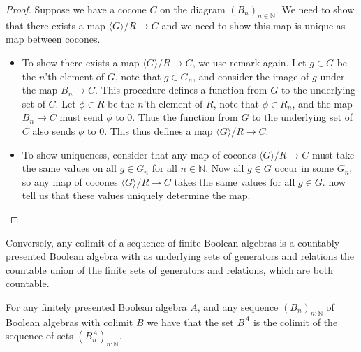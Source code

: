 \begin{proof}
  Suppose we have a cocone $C$ on the diagram $(B_n)_{n\in\mathbb N}$. 
  We need to show that there exists a map $\langle G \rangle / R\to C$ and
  we need to show this map is unique as map between cocones. 
  \begin{itemize}
    \item To show there exists a map $\langle G \rangle / R \to C$, 
      we use remark  again. 
      Let $g\in G$ be the $n$'th element of $G$, 
      note that $g\in G_n$, and consider the image of $g$ under the map $B_n \to C$. 
      This procedure defines a function from $G$ to the underlying set of $C$. 
      Let $\phi \in R$ be the $n$'th element of $R$, 
      note that $\phi \in R_n$, and the map $B_n \to C$ must send $\phi$ to $0$. 
      Thus the function from $G$ to the underlying set of $C$ also sends $\phi$ to $0$. 
      This thus defines a map $\langle G \rangle / R \to C$. 
    \item To show uniqueness, consider that any map of cocones $\langle G \rangle /R \to C$ 
      must take the same values on all $g\in G_n$ for all $n\in\mathbb N$. 
      Now all $g\in G$ occur in some $G_n$, so any map of cocones $\langle G \rangle /R \to C$ 
      takes the same values for all $g\in G$. 
       now tell us that these values uniquely determine the map. 
  \end{itemize}
\end{proof}
\begin{remark}
  Conversely, any colimit of a sequence of finite Boolean algebras 
  is a countably presented Boolean algebra with 
  as underlying sets of generators and relations the countable union of the finite sets of 
  generators and relations, which are both countable. 
\end{remark}
\begin{lemma}\label{lemFinitelyPresentedBACompact}
  For any finitely presented Boolean algebra $A$,
  and any sequence $(B_n)_{n:\mathbb N}$ of Boolean algebras with colimit $B$
  we have that the set $B^A$ is the colimit of the sequence of sets $(B_n^A)_{n:\mathbb N}$. 
\end{lemma}  
